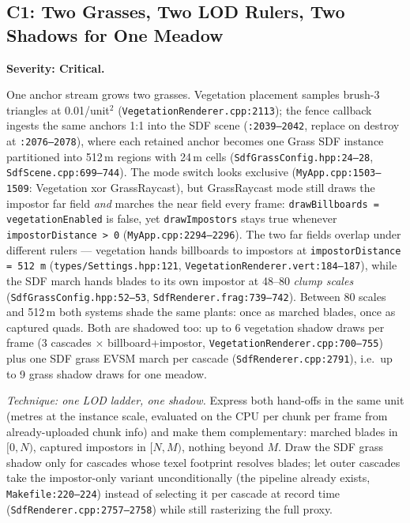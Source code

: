 \documentclass[11pt,a4paper]{article}
\begin{document}
\subsection{C1: Two Grasses, Two LOD Rulers, Two Shadows for One Meadow}
\label{sec:c1}

\textbf{Severity: Critical.}

One anchor stream grows two grasses. Vegetation placement samples
brush-3 triangles at 0.01/unit$^2$ (\texttt{VegetationRenderer.cpp:2113});
the fence callback ingests the same anchors 1:1 into the SDF scene
(\texttt{:2039--2042}, replace on destroy at \texttt{:2076--2078}), where
each retained anchor becomes one Grass SDF instance partitioned into
512\,m regions with 24\,m cells (\texttt{SdfGrassConfig.hpp:24--28},
\texttt{SdfScene.cpp:699--744}). The mode switch looks exclusive
(\texttt{MyApp.cpp:1503--1509}: Vegetation xor GrassRaycast), but
GrassRaycast mode still draws the impostor far field \emph{and} marches the
near field every frame: \texttt{drawBillboards = vegetationEnabled} is
false, yet \texttt{drawImpostors} stays true whenever
\texttt{impostorDistance > 0} (\texttt{MyApp.cpp:2294--2296}). The two
far fields overlap under different rulers --- vegetation hands billboards to
impostors at \texttt{impostorDistance = 512\,m}
(\texttt{types/Settings.hpp:121},
\texttt{VegetationRenderer.vert:184--187}), while the SDF march hands blades
to its own impostor at 48--80 \emph{clump scales}
(\texttt{SdfGrassConfig.hpp:52--53},
\texttt{SdfRenderer.frag:739--742}). Between 80 scales and 512\,m both
systems shade the same plants: once as marched blades, once as captured
quads. Both are shadowed too: up to 6 vegetation shadow draws per frame
(3 cascades $\times$ billboard+impostor,
\texttt{VegetationRenderer.cpp:700--755}) plus one SDF grass EVSM march per
cascade (\texttt{SdfRenderer.cpp:2791}), i.e.\ up to 9 grass shadow draws
for one meadow.

\textit{Technique: one LOD ladder, one shadow.} Express both hand-offs in
the same unit (metres at the instance scale, evaluated on the CPU per chunk
per frame from already-uploaded chunk info) and make them complementary:
marched blades in $[0, N)$, captured impostors in $[N, M)$, nothing beyond
$M$. Draw the SDF grass shadow only for cascades whose texel footprint
resolves blades; let outer cascades take the impostor-only variant
unconditionally (the pipeline already exists,
\texttt{Makefile:220--224}) instead of selecting it per cascade at record
time (\texttt{SdfRenderer.cpp:2757--2758}) while still rasterizing the full
proxy.
\end{document}
